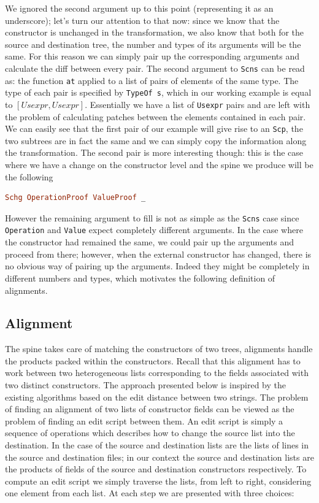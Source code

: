 \documentclass[11pt]{article}
\begin{document}
We ignored the second argument up to this point (representing it as an underscore); let's turn our attention to 
that now: since we know that the constructor is unchanged in the transformation, we also know that 
both for the source and destination tree, the number and types of its arguments 
will be the same. For this reason we can simply pair up the corresponding 
arguments and calculate the diff between every pair. The second argument to \texttt{Scns} can be read as: the function 
\texttt{at} applied to a list of pairs of elements of the same type. The type of each 
pair is specified by \texttt{TypeOf s}, which in our working example is equal to 
$[Usexpr, Usexpr]$. Essentially we have a list of \texttt{Usexpr} pairs and are 
left with the problem of calculating patches between the elements contained in 
each pair. 
We can easily see that the first pair of our example will give rise to an 
\texttt{Scp}, the two subtrees are in fact the same and we can simply copy the 
information along the transformation. The second pair is more interesting 
though: this is the case where we have a change on the constructor level and the 
spine we produce will be the following
\begin{lstlisting}[language=haskell]
  Schg OperationProof ValueProof _
\end{lstlisting}
However the remaining argument to fill is not as simple as the \texttt{Scns} 
case since \texttt{Operation} and \texttt{Value} expect completely different 
arguments.
In the case where the constructor had remained the same, we could 
pair up the arguments and proceed from there; however, when the
external constructor has changed, there is no obvious way of pairing up
the arguments. Indeed they might be completely in different numbers and types, which 
motivates the following definition of alignments.

\subsection{Alignment}\label{alignment}

The spine takes care of matching
the constructors of two trees, alignments handle the products packed within the constructors.
Recall that this alignment has to work between two heterogeneous lists
corresponding to the fields associated with two distinct constructors.
The approach presented below is inspired by the existing algorithms
based on the edit distance between two strings. The problem of finding
an alignment of two lists of constructor fields can be viewed as the
problem of finding an edit script between them. An edit script is
simply a sequence of operations which describes how to change the source
list into the destination. In the case of \diff the source and destination lists are the lists of lines in the source and destination files; in our context
the source and destination lists are the products of fields of the source and destination constructors respectively. 
To compute an edit script we simply
traverse the lists, from left to right, considering one element from each
list. At each step we are presented with three choices:
\end{document}
